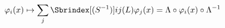 \begin{equation}	\label{3.5}
\varphi_i(x) \mapsto \sum_{j} \Sbrindex[(S^{-1})]{i}{j}(L) \varphi_j(x)
=
\Lambda\circ \varphi_i(x) \circ \Lambda^{-1}
	\end{equation}

